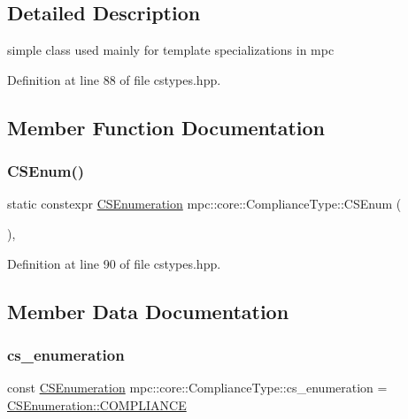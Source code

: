 \subsection{Detailed Description}
simple class used mainly for template specializations in mpc 

Definition at line 88 of file cstypes.\+hpp.



\subsection{Member Function Documentation}
\mbox{\label{structmpc_1_1core_1_1_compliance_type_a4ad878ddbe11a020e9ae2ea400deaf5d}} 
\subsubsection{\texorpdfstring{C\+S\+Enum()}{CSEnum()}}
{\footnotesize\ttfamily static constexpr \mbox{\hyperlink{namespacempc_1_1core_ad3e8e7d43bfc9202d954d999f7d5c991}{C\+S\+Enumeration}} mpc\+::core\+::\+Compliance\+Type\+::\+C\+S\+Enum (\begin{DoxyParamCaption}{ }\end{DoxyParamCaption})\hspace{0.3cm}{\ttfamily [inline]}, {\ttfamily [static]}}



Definition at line 90 of file cstypes.\+hpp.



\subsection{Member Data Documentation}
\mbox{\label{structmpc_1_1core_1_1_compliance_type_a05e820ab5e2f22d2f66b0d1d91ff3c0b}} 
\subsubsection{\texorpdfstring{cs\+\_\+enumeration}{cs\_enumeration}}
{\footnotesize\ttfamily const \mbox{\hyperlink{namespacempc_1_1core_ad3e8e7d43bfc9202d954d999f7d5c991}{C\+S\+Enumeration}} mpc\+::core\+::\+Compliance\+Type\+::cs\+\_\+enumeration = \mbox{\hyperlink{namespacempc_1_1core_ad3e8e7d43bfc9202d954d999f7d5c991a185bd2ffef1962ade3c0889c62cee500}{C\+S\+Enumeration\+::\+C\+O\+M\+P\+L\+I\+A\+N\+CE}}}



